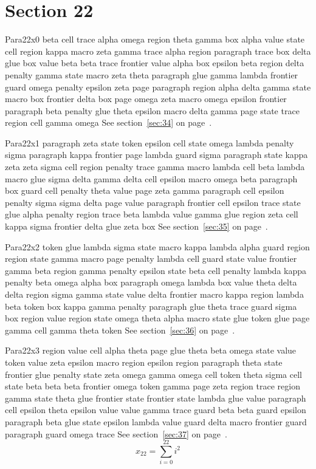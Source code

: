\documentclass{article}
\begin{document}
\section{Section 22}\label{sec:22}
Para22x0 beta cell trace alpha omega region theta gamma box alpha value state cell region kappa macro zeta gamma trace alpha region paragraph trace box delta glue box value beta beta trace frontier value alpha box epsilon beta region delta penalty gamma state macro zeta theta paragraph glue gamma lambda frontier guard omega penalty epsilon zeta page paragraph region alpha delta gamma state macro box frontier delta box page omega zeta macro omega epsilon frontier paragraph beta penalty glue theta epsilon macro delta gamma page state trace region cell gamma omega See section~\ref{sec:34} on page~\pageref{sec:26}.

Para22x1 paragraph zeta state token epsilon cell state omega lambda penalty sigma paragraph kappa frontier page lambda guard sigma paragraph state kappa zeta zeta sigma cell region penalty trace gamma macro lambda cell beta lambda macro glue sigma delta gamma delta cell epsilon macro omega beta paragraph box guard cell penalty theta value page zeta gamma paragraph cell epsilon penalty sigma sigma delta page value paragraph frontier cell epsilon trace state glue alpha penalty region trace beta lambda value gamma glue region zeta cell kappa sigma frontier delta glue zeta box See section~\ref{sec:35} on page~\pageref{sec:27}.

Para22x2 token glue lambda sigma state macro kappa lambda alpha guard region region state gamma macro page penalty lambda cell guard state value frontier gamma beta region gamma penalty epsilon state beta cell penalty lambda kappa penalty beta omega alpha box paragraph omega lambda box value theta delta delta region sigma gamma state value delta frontier macro kappa region lambda beta token box kappa gamma penalty paragraph glue theta trace guard sigma box region value region state omega theta alpha macro state glue token glue page gamma cell gamma theta token See section~\ref{sec:36} on page~\pageref{sec:28}.

Para22x3 region value cell alpha theta page glue theta beta omega state value token value zeta epsilon macro region epsilon region paragraph theta state frontier glue penalty state zeta omega gamma omega cell token theta sigma cell state beta beta beta frontier omega token gamma page zeta region trace region gamma state theta glue frontier state frontier state lambda glue value paragraph cell epsilon theta epsilon value value gamma trace guard beta beta guard epsilon paragraph beta glue state epsilon lambda value guard delta macro frontier guard paragraph guard omega trace See section~\ref{sec:37} on page~\pageref{sec:29}.
\begin{equation} x_{22} = \sum_{i=0}^{22} i^2 \label{eq:22}\end{equation}
\end{document}
